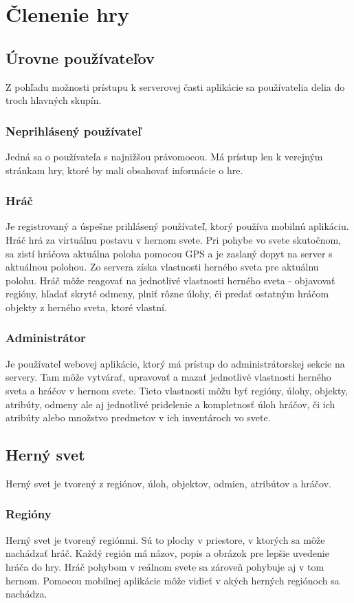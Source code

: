 \section{Členenie hry}
\subsection{Úrovne používateľov}
Z pohľadu možnosti prístupu k serverovej časti aplikácie sa používatelia delia do troch hlavných skupín. 

\subsubsection{Neprihlásený používateľ}
Jedná sa o používateľa s najnižšou právomocou. Má prístup len k verejným stránkam hry, ktoré by mali obsahovať informácie o hre.

\subsubsection{Hráč}
Je registrovaný a úspešne prihlásený používateľ, ktorý používa mobilnú aplikáciu. Hráč hrá za virtuálnu postavu v hernom svete. Pri pohybe vo svete skutočnom, sa zistí hráčova aktuálna poloha pomocou GPS a je zaslaný dopyt na server s aktuálnou polohou. Zo servera získa vlastnosti herného sveta pre aktuálnu polohu. Hráč môže reagovať na jednotlivé vlastnosti herného sveta - objavovať regióny, hľadať skryté odmeny, plniť rôzne úlohy, či predať ostatným hráčom objekty z herného sveta, ktoré vlastní.

\subsubsection{Administrátor}
Je používateľ webovej aplikácie, ktorý má prístup do administrátorskej sekcie na servery. Tam môže vytvárať, upravovať a mazať jednotlivé vlastnosti herného sveta a hráčov v hernom svete. Tieto vlastnosti môžu byť regióny, úlohy, objekty, atribúty, odmeny ale aj jednotlivé pridelenie a kompletnosť úloh hráčov, či ich atribúty alebo množstvo predmetov v ich inventároch   vo svete. 

\subsection{Herný svet}
Herný svet je tvorený z regiónov, úloh, objektov, odmien, atribútov a hráčov.

\subsubsection{Regióny}
Herný svet je tvorený regiónmi. Sú to plochy v priestore, v ktorých sa môže nachádzať hráč. Každý región má názov, popis a obrázok pre lepšie uvedenie hráča do hry. Hráč pohybom v reálnom svete sa zároveň pohybuje aj v tom hernom. Pomocou mobilnej aplikácie môže vidieť v akých herných regiónoch sa nachádza.

